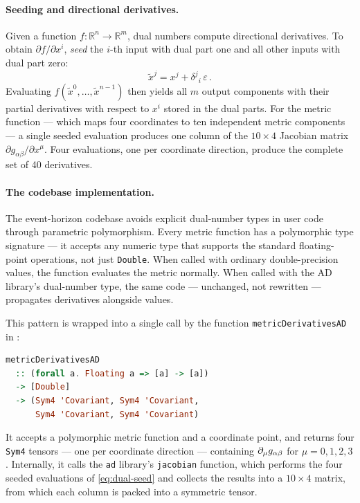 \paragraph{Seeding and directional derivatives.}

Given a function $f : \mathbb{R}^n \to \mathbb{R}^m$,
dual numbers compute directional derivatives.  To
obtain $\partial f / \partial x^i$, \emph{seed} the $i$-th
input with dual part one and all other inputs with dual part
zero:
%
\begin{equation}
  \tilde{x}^j = x^j + \delta^j{}_i\,\varepsilon \,.
  \label{eq:dual-seed}
\end{equation}
%
Evaluating $f(\tilde{x}^0, \ldots, \tilde{x}^{n-1})$ then
yields all $m$ output components with their partial
derivatives with respect to $x^i$ stored in the dual parts.
For the metric function --- which maps four coordinates to
ten independent metric components --- a single seeded
evaluation produces one column of the $10 \times 4$ Jacobian
matrix $\partial g_{\alpha\beta} / \partial x^\mu$.  Four
evaluations, one per coordinate direction, produce the
complete set of 40 derivatives.

\paragraph{The codebase implementation.}

The event-horizon codebase avoids explicit dual-number
types in user code through parametric polymorphism.  Every
metric function has a polymorphic type
signature --- it accepts any numeric type that supports the
standard floating-point operations, not just
\texttt{Double}.  When called with ordinary double-precision
values, the function evaluates the metric normally.  When
called with the AD library's dual-number type, the same
code --- unchanged, not rewritten --- propagates derivatives
alongside values.

This pattern is wrapped into a single call by the function
\texttt{metricDerivativesAD} in
:
%
\begin{lstlisting}[language=Haskell]
metricDerivativesAD
  :: (forall a. Floating a => [a] -> [a])
  -> [Double]
  -> (Sym4 'Covariant, Sym4 'Covariant,
      Sym4 'Covariant, Sym4 'Covariant)
\end{lstlisting}
%
It accepts a polymorphic metric function and a coordinate
point, and returns four \texttt{Sym4} tensors --- one per
coordinate direction --- containing $\partial_{\mu} g_{\alpha\beta}$
for $\mu = 0, 1, 2, 3$.  Internally, it calls the
\texttt{ad} library's \texttt{jacobian} function, which
performs the four seeded evaluations of
\cref{eq:dual-seed} and collects the results into a
$10 \times 4$ matrix, from which each column is packed into a
symmetric tensor.

